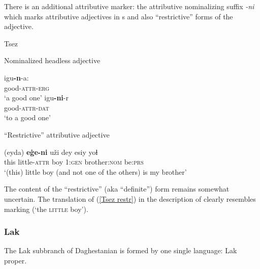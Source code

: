 There is an additional attributive marker: the attributive nominalizing suffix \textit{-ni} which marks attributive adjectives in s and also “restrictive” forms of the adjective.
\begin{exe}
\ex 
{\rm Tsez \citep{alekseev-etal2004}}
\begin{xlist}
\ex	
{\rm Nominalized headless adjective}
\begin{xlist}
\ex
\gll	igu\textbf{-n}-a:\\
	good-\textsc{attr}-\textsc{erg}\\
\glt	‘a good one’
\ex
\gll	igu\textbf{-ni}-r\\
	good-\textsc{attr}-\textsc{dat}\\
\glt	‘to a good one’
\end{xlist}

\ex	
{\rm “Restrictive” attributive adjective}
\begin{xlist}
\ex	
\label{Tsez restr}
\gll	(eyda) \textbf{eġe-ni} uži dey esiy yoɬ\\
	this little-\textsc{attr} boy \textsc{1:gen} brother:\textsc{nom} be:\textsc{prs}\\
\glt	‘(this) little boy (and not one of the others) is my brother’
\end{xlist}
\end{xlist}
\end{exe}
The content of the “restrictive” (aka “definite”) form remains somewhat uncertain. The translation of (\ref{Tsez restr}) in the description of \citet[128]{alekseev-etal2004} clearly resembles  marking (‘the \textsc{little} boy’).

\subsubsection{Lak}
The Lak subbranch of Daghestanian is formed by one single language: Lak proper.

